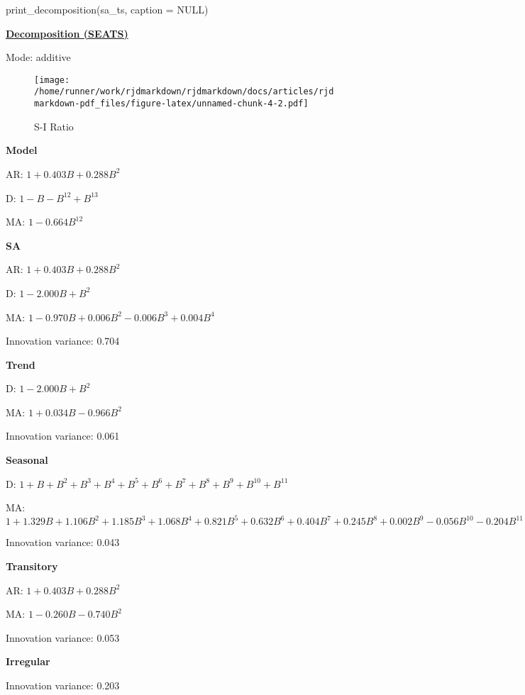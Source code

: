 \documentclass[
]{article}
\newenvironment{Shaded}{\begin{snugshade}}{\end{snugshade}}
\newcommand{\AttributeTok}[1]{\textcolor[rgb]{0.77,0.63,0.00}{#1}}
\newcommand{\ConstantTok}[1]{\textcolor[rgb]{0.00,0.00,0.00}{#1}}
\newcommand{\FunctionTok}[1]{\textcolor[rgb]{0.00,0.00,0.00}{#1}}
\newcommand{\NormalTok}[1]{#1}
\begin{document}
\begin{Shaded}
\begin{Highlighting}[]
\FunctionTok{print\_decomposition}\NormalTok{(sa\_ts, }\AttributeTok{caption =} \ConstantTok{NULL}\NormalTok{)}
\end{Highlighting}
\end{Shaded}

\underline{\textbf{Decomposition (SEATS)}}

Mode: additive

\begin{figure}
\centering
\texttt{[image: /home/runner/work/rjdmarkdown/rjdmarkdown/docs/articles/rjdmarkdown-pdf\_files/figure-latex/unnamed-chunk-4-2.pdf]}
\caption{S-I Ratio}
\end{figure}

\textbf{Model}

AR: \(1+0.403B+0.288B^{2}\)

D: \(1-B-B^{12}+B^{13}\)

MA: \(1-0.664B^{12}\)

\textbf{SA}

AR: \(1+0.403B+0.288B^{2}\)

D: \(1-2.000B+B^{2}\)

MA: \(1-0.970B+0.006B^{2}-0.006B^{3}+0.004B^{4}\)

Innovation variance: 0.704

\textbf{Trend}

D: \(1-2.000B+B^{2}\)

MA: \(1+0.034B-0.966B^{2}\)

Innovation variance: 0.061

\textbf{Seasonal}

D: \(1+B+B^{2}+B^{3}+B^{4}+B^{5}+B^{6}+B^{7}+B^{8}+B^{9}+B^{10}+B^{11}\)

MA:
\(1+1.329B+1.106B^{2}+1.185B^{3}+1.068B^{4}+0.821B^{5}+0.632B^{6}+0.404B^{7}+0.245B^{8}+0.002B^{9}-0.056B^{10}-0.204B^{11}\)

Innovation variance: 0.043

\textbf{Transitory}

AR: \(1+0.403B+0.288B^{2}\)

MA: \(1-0.260B-0.740B^{2}\)

Innovation variance: 0.053

\textbf{Irregular}

Innovation variance: 0.203
\end{document}
